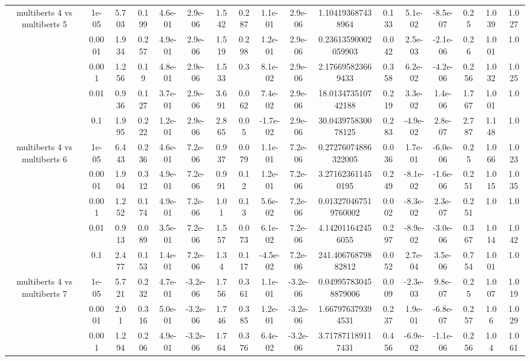 \begin{tabular}{|c|c|c|c|c|c|c|c|c|c|c|c|c|c|c|c|c|}
\hline
\multirow{5}{*}{multiberts 4 vs multiberts 5} & 1e-05 & 5.703 & 0.199 & 4.6e-01 & 2.9e-06 & 1.542 & 0.287 & 1.1e-01 & 2.9e-06 & 1.104193687438964 & 0.133 & 5.1e-02 & -8.5e-07 & 0.25 & 1.039 & 1.027 \\
 & 0.0001 & 1.934 & 0.257 & 4.9e-01 & 2.9e-06 & 1.519 & 0.298 & 1.2e-01 & 2.9e-06 & 0.23613590002059903 & 0.042 & 2.5e-03 & -2.1e-06 & 0.26 & 1.001 & 1.0 \\
 & 0.001 & 1.256 & 0.19 & 4.8e-01 & 2.9e-06 & 1.533 & 0.3 & 8.1e-02 & 2.9e-06 & 2.176695823669433 & 0.358 & 6.2e-02 & -4.2e-06 & 0.256 & 1.032 & 1.025 \\
 & 0.01 & 0.936 & 0.127 & 3.7e-01 & 2.9e-06 & 3.691 & 0.062 & 7.4e-02 & 2.9e-06 & 18.013473510742188 & 0.219 & 3.3e-02 & 1.4e-06 & 1.767 & 1.001 & 1.0 \\
 & 0.1 & 1.995 & 0.222 & 1.2e-01 & 2.9e-06 & 2.865 & 0.05 & -1.7e-02 & 2.9e-06 & 30.043975830078125 & 0.283 & -4.9e-02 & 2.8e-07 & 2.787 & 1.148 & 1.0 \\
\hline
\multirow{5}{*}{multiberts 4 vs multiberts 6} & 1e-05 & 6.443 & 0.236 & 4.6e-01 & 7.2e-06 & 0.937 & 0.079 & 1.1e-01 & 7.2e-06 & 0.27276074886322005 & 0.036 & 1.7e-01 & -6.0e-06 & 0.25 & 1.066 & 1.023 \\
 & 0.0001 & 1.904 & 0.312 & 4.9e-01 & 7.2e-06 & 0.991 & 0.12 & 1.2e-01 & 7.2e-06 & 3.271623611450195 & 0.249 & -8.1e-02 & -1.6e-06 & 0.251 & 1.015 & 1.035 \\
 & 0.001 & 1.252 & 0.174 & 4.9e-01 & 7.2e-06 & 1.01 & 0.13 & 5.6e-02 & 7.2e-06 & 0.013270467519760002 & 0.002 & -8.3e-02 & 2.3e-07 & 0.251 & 1.0 & 1.0 \\
 & 0.01 & 0.913 & 0.089 & 3.5e-01 & 7.2e-06 & 1.557 & 0.073 & 6.1e-02 & 7.2e-06 & 4.142011642456055 & 0.297 & -8.9e-02 & -3.0e-06 & 0.367 & 1.014 & 1.042 \\
 & 0.1 & 2.477 & 0.153 & 1.4e-01 & 7.2e-06 & 1.34 & 0.117 & -4.5e-02 & 7.2e-06 & 241.40676879882812 & 0.052 & 2.7e-04 & 3.5e-06 & 0.754 & 1.001 & 1.0 \\
\hline
\multirow{5}{*}{multiberts 4 vs multiberts 7} & 1e-05 & 5.721 & 0.232 & 4.7e-01 & -3.2e-06 & 1.756 & 0.361 & 1.1e-01 & -3.2e-06 & 0.049957830458879006 & 0.009 & -2.3e-03 & 9.8e-07 & 0.25 & 1.007 & 1.019 \\
 & 0.0001 & 2.01 & 0.316 & 5.0e-01 & -3.2e-06 & 1.746 & 0.385 & 1.2e-01 & -3.2e-06 & 1.667976379394531 & 0.237 & 1.9e-01 & -6.8e-07 & 0.257 & 1.06 & 1.029 \\
 & 0.001 & 1.294 & 0.206 & 4.9e-01 & -3.2e-06 & 1.764 & 0.376 & 6.4e-02 & -3.2e-06 & 3.717871189117431 & 0.456 & -6.9e-02 & -1.1e-06 & 0.256 & 1.04 & 1.061 \\

\end{tabular}
